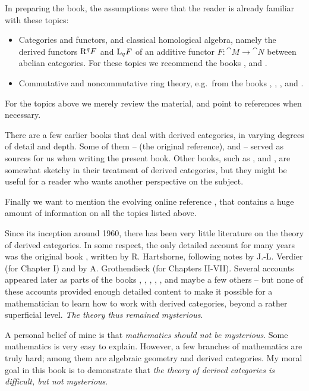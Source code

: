 
In preparing the book, the assumptions were that the reader is already familiar 
with these topics:
\begin{itemize}
\item Categories and functors, and classical homological 
algebra, namely the derived functors $\mathrm{R}^q F$ and $\mathrm{L}_q F$
of an additive functor $F : \cat{M} \to \cat{N}$ between abelian  
categories. For these topics we recommend the books 
\cite{Mac1}, \cite{HiSt} and \cite{Rot}. 

\item Commutative and noncommutative ring theory, e.g.\ from the books
\cite{Eis}, \cite{Mats}, \cite{AlKl}, \cite{Row} and \cite{Rot}.  
\end{itemize}

For the topics above we merely review the material, and point to references 
when necessary.

There are a few earlier books that deal with derived categories, in varying 
degrees of detail and depth. Some of them -- \cite{RD} (the original 
reference), \cite{KaSc1} and \cite{KaSc2} -- served as sources for us when 
writing the present book. Other books, such as \cite{GeMa},  
\cite{We} and \cite{Huy}, are somewhat sketchy in their treatment of derived 
categories, but they might be useful for a reader who wants another perspective 
on the subject. 

Finally we want to mention the evolving online reference \cite{SP}, that 
contains a huge amount of information on all the topics listed above. 

Since its inception around 1960, there has been very little literature on the 
theory of derived categories. In some respect, the only detailed account for 
many years was the original book \cite{RD}, written by R. Hartshorne, following 
notes by J.-L. Verdier (for Chapter I) and by A. Grothendieck (for Chapters 
II-VII). Several accounts appeared later as parts of the books 
\cite{We}, \cite{GeMa}, \cite{KaSc1}, \cite{KaSc2}, \cite{Huy}, and maybe a few 
others -- but none of these accounts provided enough detailed content to make 
it possible for a mathematician to learn  how to work with derived categories, 
beyond a rather superficial level. {\em The theory thus remained mysterious}. 

A personal belief of mine is that {\em mathematics should not be mysterious}. 
Some mathematics is very easy to explain. However, a few branches of 
mathematics are truly hard; among them are algebraic geometry and derived 
categories. My moral goal in this book is to demonstrate 
that {\em the theory of derived categories is difficult, but not mysterious}. 

